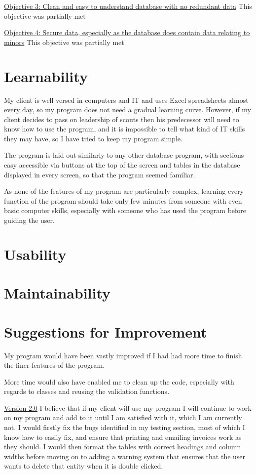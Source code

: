 \underline{Objective 3: Clean and easy to understand database with no redundant data}
This objective was partially met

\underline{Objective 4: Secure data, especially as the database does contain data relating to minors}
This objective was partially met


\section{Learnability}
My client is well versed in computers and IT and uses Excel spreadsheets almost every day, so my program does not need a gradual learning curve. However, if my client decides to pass on leadership of scouts then his predecessor will need to know how to use the program, and it is impossible to tell what kind of IT skills they may have, so I have tried to keep my program simple.

The program is laid out similarly to any other database program, with sections easy accessible via buttons at the top of the screen and tables in the database displayed in every screen, so that the program seemed familiar.

As none of the features of my program are particularly complex, learning every function of the program should take only few minutes from someone with even basic computer skills, especially with someone who has used the program before guiding the user.

\section{Usability}

\section{Maintainability}

\section{Suggestions for Improvement}
My program would have been vastly improved if I had had more time to finish the finer features of the program.

More time would also have enabled me to clean up the code, especially with regards to classes and reusing the validation functions.

\underline{Version 2.0}
I believe that if my client will use my program I will continue to work on my program and add to it until I am satisfied with it, which I am currently not. I would firstly fix the bugs identified in my testing section, most of which I know how to easily fix, and ensure that printing and emailing invoices work as they should. I would then format the tables with correct headings and column widths before moving on to adding a warning system that ensures that the user wants to delete that entity when it is double clicked. 

